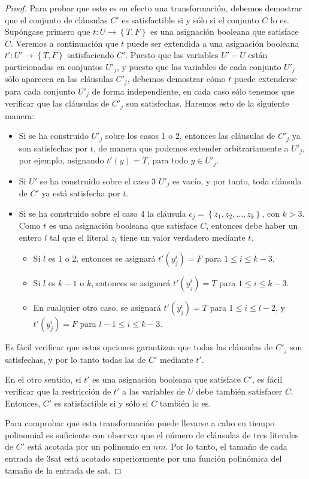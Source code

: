 \documentclass[11pt, a4paper]{memoir}
\begin{document}
\begin{proof}
\vspace{0.5cm}

Para probar que esto es en efecto una transformación, debemos demostrar que el conjunto de cláusulas $C'$ es satisfactible si y sólo si el conjunto $C$ lo es. Supóngase primero que $t:U\rightarrow \left \{T,F \right \}$ es una asignación booleana que satisface $C$. Veremos a continuación que $t$ puede ser extendida a una asignación booleana $t':U'\rightarrow \left \{T,F \right \}$ satisfaciendo $C'$. Puesto que las variables $U' - U$ están particionadas en conjuntos $U'_j$, y puesto que las variables de cada conjunto $U'_j$ sólo aparecen en las cláusulas $C'_j$, debemos demostrar cómo $t$ puede extenderse para cada conjunto $U'_j$ de forma independiente, en cada caso sólo tenemos que verificar que las cláusulas de $C'_j$ son satisfechas. Haremos esto de la siguiente manera:

\begin{itemize}
	\item Si se ha construido $U'_j$ sobre los casos 1 o 2, entonces las cláusulas de $C'_j$ ya son satisfechas por $t$, de manera que podemos extender arbitrariamente a $U'_j$, por ejemplo, asignando $t'(y) = T$, para todo $y\in U'_j$. 
	\item Si $U'$ se ha construido sobre el caso 3 $U'_j$ es vacío, y por tanto, toda cláusula de $C'$ ya está satisfecha por $t$.
	\item Si se ha construido sobre el caso 4 la cláusula $c_j=\left \{ z_1, z_2, \dots, z_k \right \}$, con $k > 3$. Como $t$ es una asignación booleana que satisface $C$, entonces debe haber un entero $l$ tal que el literal $z_l$ tiene un valor verdadero mediante $t$.  
	\begin{itemize} 
	\item Si $l$ es 1 o 2, entonces se asignará $t'(y^i_j) = F$ para $1 \le i \le k - 3$.
	\item Si $l$ es $k - 1$ o $k$, entonces se asignará  $t'(y^i_j) = T$  para $1 \le i \le k - 3$.
	\item En cualquier otro caso, se asignará  $t'(y^i_j) = T$  para $1 \le i \le l - 2$, y $t'(y^i_j) = F$  para $l -1 \le i \le k - 3$.
	\end{itemize} 
\end{itemize}
Es fácil verificar que estas opciones garantizan que todas las cláusulas de $C'_j$ son satisfechas, y por lo tanto todas las de $C'$ mediante $t'$.  

En el otro sentido, si $t'$ es una asignación booleana que satisface $C'$, es fácil verificar que la restricción de $t'$ a las variables de $U$ debe también satisfacer $C$. Entonces, $C'$ es satisfactible si y sólo si $C$ también lo es.

Para comprobar que esta transformación puede llevarse a cabo en tiempo polinomial es suficiente con observar que el número de cláusulas de tres literales de $C'$ está acotada por un polinomio en $nm$. Por lo tanto, el tamaño de cada entrada de \gls{3sat} está acotado superiormente por una función polinómica del tamaño de la entrada de \gls{sat}. 

\end{proof}


\clearpage
\printglossary[type=\acronymtype]
\end{document}
